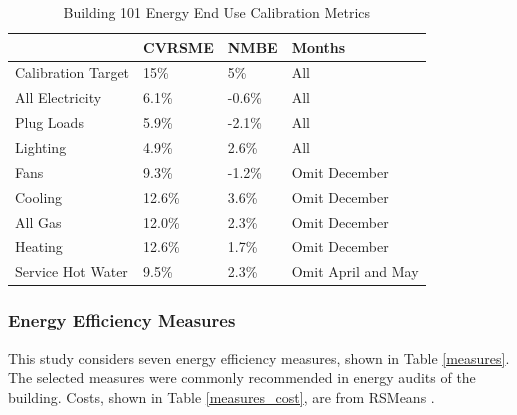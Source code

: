 \documentclass[review]{elsarticle}
\begin{document}
\begin{table}[h]
	\centering
	\begin{tabular}{l l l l}
		\hline
		& \textbf{CVRSME} & \textbf{NMBE} & \textbf{Months}\\
		\hline
		Calibration Target & 15\% & 5\% & All \\
		All Electricity & 6.1\% & -0.6\% & All \\
		Plug Loads & 5.9\% & -2.1\% & All \\
		Lighting & 4.9\% & 2.6\% & All \\
		Fans & 9.3\% & -1.2\% & Omit December \\
		Cooling & 12.6\% & 3.6\% & Omit December \\
		All Gas & 12.0\% & 2.3\% & Omit December \\
		Heating & 12.6\% & 1.7\% & Omit December \\
		Service Hot Water & 9.5\% & 2.3\% & Omit April and May \\
		\hline
	\end{tabular}
	\caption{Building 101 Energy End Use Calibration Metrics}
	\label{calibration}
\end{table}

\subsubsection{Energy Efficiency Measures}
This study considers seven energy efficiency measures, shown in Table \ref{measures}.  The selected measures were commonly recommended in energy audits of the building.  Costs, shown in Table \ref{measures_cost}, are from RSMeans \cite{RSmeans2014}.
\end{document}
